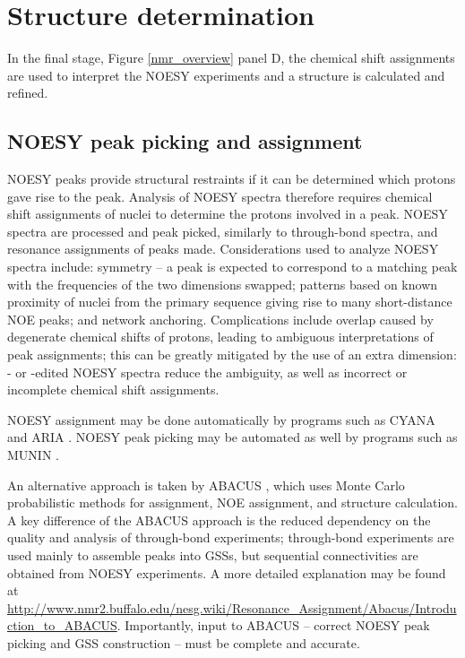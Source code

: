 \section{Structure determination}

In the final stage, Figure \ref{nmr_overview} panel D, the chemical shift 
assignments are used to interpret the NOESY experiments and a structure
is calculated and refined.

\subsection*{NOESY peak picking and assignment}
NOESY peaks provide structural restraints if it can be 
determined which protons gave rise to the peak.  Analysis of NOESY spectra 
therefore requires chemical shift assignments of nuclei to 
determine the protons involved in a peak.  NOESY spectra are processed and 
peak picked, similarly to through-bond spectra, and resonance assignments of 
peaks made.  Considerations used to analyze 
NOESY spectra include: symmetry -- a peak is expected to correspond to a 
matching peak with the frequencies of the two \nmrisoh{} dimensions swapped; patterns 
based on known proximity of nuclei from the primary sequence giving rise to 
many short-distance NOE peaks; and network anchoring.  Complications include 
overlap caused by degenerate chemical shifts of protons, leading to 
ambiguous interpretations of peak assignments; this can be greatly mitigated 
by the use of an extra dimension:  \nmrison{}- or \nmrisoc{}-edited NOESY spectra reduce 
the ambiguity, as well as incorrect or incomplete chemical shift assignments.

NOESY assignment may be done automatically by programs such as CYANA and 
ARIA \cite{cyana2004, aria2003}.  
NOESY peak picking may be automated as well by programs such as
MUNIN \cite{munin, korzhnev2001munin}.

An alternative approach is taken by ABACUS \cite{abacus_assignment}, which uses
Monte Carlo probabilistic methods for assignment, NOE assignment, and structure
calculation.  A key difference of the ABACUS approach is the reduced dependency
on the quality and analysis of through-bond experiments; through-bond experiments
are used mainly to assemble peaks into GSSs, but sequential connectivities are
obtained from NOESY experiments.  A more detailed explanation may be found at 
\url{http://www.nmr2.buffalo.edu/nesg.wiki/Resonance_Assignment/Abacus/Introduction_to_ABACUS}.
Importantly, input to ABACUS -- correct NOESY peak picking and GSS construction
-- must be complete and accurate.

